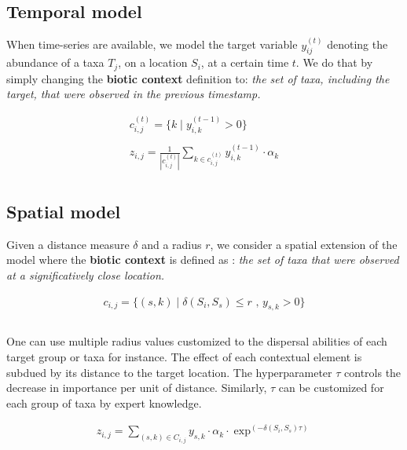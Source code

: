 \documentclass[]{article}
\begin{document}
\subsection{Temporal model}
When time-series are available, we model the target variable $y_{ij}^{(t)}$ denoting the abundance of a taxa $T_j$, on a location $S_i$, at a certain time $t$. We do that by simply changing the \textbf{biotic context} definition to: \textit{the set of taxa, including the target, that were observed in the previous timestamp.}

\begin{equation*}
\begin{matrix}
c_{i,j}^{(t)} = \{k  \mid y_{i,k}^{(t-1)}>0 \} \\\\ 
z_{i,j} = \frac{1}{|c_{i,j}^{(t)}|}\sum_{k \in c_{i,j}^{(t)}} y_{i,k}^{(t-1)} \cdot \alpha_{k}\\
\end{matrix}
\end{equation*}

\subsection{Spatial model}
Given a distance measure $\delta$ and a radius $r$, we consider a spatial extension of the model where the \textbf{biotic context} is defined as : \textit{the set of taxa that were observed at a significatively close location.}

\begin{equation*}
\begin{matrix}
c_{i,j} = \{(s,k)  \mid \delta(S_i,S_s)\leq r \text{ , } y_{s,k}>0 \} \\\\ 
\end{matrix}
\end{equation*}

\noindent One can use multiple radius values customized to the dispersal abilities of each target group or taxa for instance. The effect of each contextual element is subdued by its distance to the target location. The hyperparameter $\tau$ controls the decrease in importance per unit of distance. Similarly, $\tau$ can be customized for each group of taxa by expert knowledge.  

\begin{equation*}
\begin{matrix}
z_{i,j} = \sum_{(s,k) \in C_{i,j}} y_{s,k} \cdot \alpha_{k} \cdot \exp^{(-\delta(S_i,S_s) \tau)} \\
\end{matrix}
\end{equation*}
\end{document}
